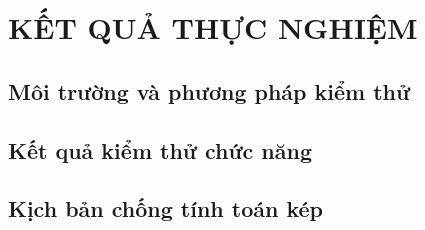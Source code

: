 
\chapter{KẾT QUẢ THỰC NGHIỆM}
\label{chap:ketqua}



\section{Môi trường và phương pháp kiểm thử}
\label{sec:pp-kiemthu}

\section{Kết quả kiểm thử chức năng}
\label{sec:kq-chucnang}

\BangTestHopDong

\BangTestAPI

\BangDoPhu


\section{Kịch bản chống tính toán kép}
\label{sec:kq-tinhtoankep}

